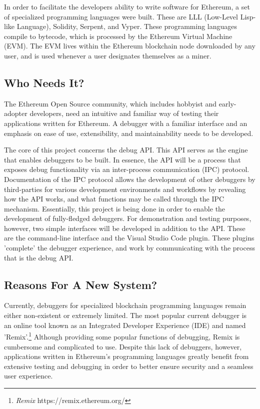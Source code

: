 \documentclass[]{article}
\begin{document}
In order to facilitate the developers ability to write software for Ethereum, a set of specialized programming languages were built. These are LLL (Low-Level Lisp-like Language), Solidity, Serpent, and Vyper. These programming languages compile to bytecode, which is processed by the Ethereum Virtual Machine (EVM). The EVM lives within the Ethereum blockchain node downloaded by any user, and is used whenever a user designates themselves as a miner.


\subsection{Who Needs It?}

The Ethereum Open Source community, which includes hobbyist and early-adopter developers, need an intuitive and familiar way of testing their applications written for Ethereum. A debugger with a familiar interface and an emphasis on ease of use, extensibility, and maintainability needs to be developed.

The core of this project concerns the debug API. This API serves as the engine that enables debuggers to be built. In essence, the API will be a process that exposes debug functionality via an inter-process communication (IPC) protocol. Documentation of the IPC protocol allows the development of other debuggers by third-parties for various development environments and workflows by revealing how the API works, and what functions may be called through the IPC mechanism. Essentially, this project is being done in order to enable the development of fully-fledged debuggers. For demonstration and testing purposes, however, two simple interfaces will be developed in addition to the API. These are the command-line interface and the Visual Studio Code plugin. These plugins 'complete' the debugger experience, and work by communicating with the process that is the debug API.

\subsection{Reasons For A New System?}
Currently, debuggers for specialized blockchain programming languages remain either non-existent or extremely limited. The most popular current debugger is an online tool known as an Integrated Developer Experience (IDE) and named 'Remix'.\footnote{\textit{Remix} https://remix.ethereum.org/} Although providing some popular functions of debugging, Remix is cumbersome and complicated to use. Despite this lack of debuggers, however, applications written in Ethereum's programming languages greatly benefit from extensive testing and debugging in order to better ensure security and a seamless user experience.
\end{document}
